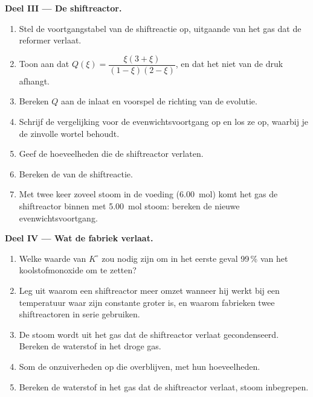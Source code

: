 \begin{problem}
\medskip
\noindent\textbf{Deel III --- De shiftreactor.}
\begin{enumerate}[resume]
  \item Stel de voortgangstabel van de shiftreactie op, uitgaande van het
        gas dat de reformer verlaat.
  \item Toon aan dat $Q(\xi) = \dfrac{\xi(3 + \xi)}{(1 - \xi)(2 - \xi)}$, en
        dat het niet van de druk afhangt.
  \item Bereken $Q$ aan de inlaat en voorspel de richting van de
        evolutie.
  \item Schrijf de vergelijking voor de evenwichtsvoortgang op en los ze
        op, waarbij je de zinvolle wortel behoudt.
  \item Geef de hoeveelheden die de shiftreactor verlaten.
  \item Bereken de  van de shiftreactie.
  \item Met twee keer zoveel stoom in de voeding (\qty{6.00}{mol}) komt het
        gas de shiftreactor binnen met \qty{5.00}{mol} stoom: bereken de
        nieuwe evenwichtsvoortgang.
\end{enumerate}

\medskip
\noindent\textbf{Deel IV --- Wat de fabriek verlaat.}
\begin{enumerate}[resume]
  \item Welke waarde van $K^\circ$ zou nodig zijn om in het eerste geval
        99\,\% van het koolstofmonoxide om te zetten?
  \item Leg uit waarom een shiftreactor meer omzet wanneer hij werkt bij
        een temperatuur waar zijn constante groter is, en waarom fabrieken
        twee shiftreactoren in serie gebruiken.
  \item De stoom wordt uit het gas dat de shiftreactor verlaat
        gecondenseerd. Bereken de  waterstof in het droge gas.
  \item Som de onzuiverheden op die overblijven, met hun hoeveelheden.
  \item Bereken de  waterstof in het gas dat de shiftreactor
        verlaat, stoom inbegrepen.
\end{enumerate}
\end{problem}
